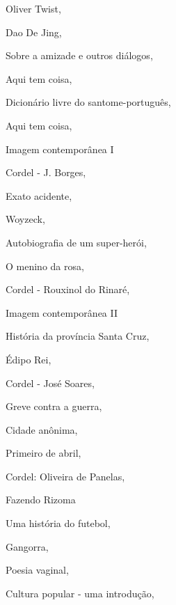 \begin{multicols}{2}
\begin{enumerate}
{\item Oliver Twist, {}
\item Dao De Jing, {}
\item Sobre a amizade e outros diálogos, {}
\item Aqui tem coisa, {}
\item Dicionário livre do santome-português, {}
\item Aqui tem coisa, {}
\item Imagem contemporânea I
\item Cordel - J. Borges, {}
\item Exato acidente, {}
\item Woyzeck, {}
\item Autobiografia de um super-herói, {}
\item O menino da rosa, {}
\item Cordel - Rouxinol do Rinaré, {}
\item Imagem contemporânea II
\item História da província Santa Cruz, {}
\item Édipo Rei, {}
\item Cordel - José Soares, {}
\item Greve contra a guerra, {}
\item Cidade anônima, {}
\item Primeiro de abril, {}
\item Cordel: Oliveira de Panelas, {}
\item Fazendo Rizoma
\item Uma história do futebol, {}
\item Gangorra, {}
\item Poesia vaginal, {}
\item Cultura popular - uma introdução, {}
}
\end{enumerate}
\end{multicols}
